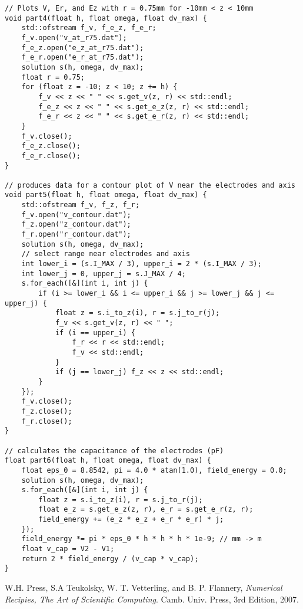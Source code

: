 \documentclass[12pt]{article}
\begin{document}
\begin{lstlisting}
// Plots V, Er, and Ez with r = 0.75mm for -10mm < z < 10mm
void part4(float h, float omega, float dv_max) {
    std::ofstream f_v, f_e_z, f_e_r;
    f_v.open("v_at_r75.dat");
    f_e_z.open("e_z_at_r75.dat");
    f_e_r.open("e_r_at_r75.dat");
    solution s(h, omega, dv_max);
    float r = 0.75;
    for (float z = -10; z < 10; z += h) {
        f_v << z << " " << s.get_v(z, r) << std::endl;
        f_e_z << z << " " << s.get_e_z(z, r) << std::endl;
        f_e_r << z << " " << s.get_e_r(z, r) << std::endl;
    }
    f_v.close();
    f_e_z.close();
    f_e_r.close();
}

// produces data for a contour plot of V near the electrodes and axis
void part5(float h, float omega, float dv_max) {
    std::ofstream f_v, f_z, f_r;
    f_v.open("v_contour.dat");
    f_z.open("z_contour.dat");
    f_r.open("r_contour.dat");
    solution s(h, omega, dv_max);
    // select range near electrodes and axis
    int lower_i = (s.I_MAX / 3), upper_i = 2 * (s.I_MAX / 3);
    int lower_j = 0, upper_j = s.J_MAX / 4;
    s.for_each([&](int i, int j) {
        if (i >= lower_i && i <= upper_i && j >= lower_j && j <= upper_j) {
            float z = s.i_to_z(i), r = s.j_to_r(j);
            f_v << s.get_v(z, r) << " ";
            if (i == upper_i) {
                f_r << r << std::endl;
                f_v << std::endl;
            }
            if (j == lower_j) f_z << z << std::endl;
        }
    });
    f_v.close();
    f_z.close();
    f_r.close();
}

// calculates the capacitance of the electrodes (pF)
float part6(float h, float omega, float dv_max) {
    float eps_0 = 8.8542, pi = 4.0 * atan(1.0), field_energy = 0.0;
    solution s(h, omega, dv_max);
    s.for_each([&](int i, int j) {
        float z = s.i_to_z(i), r = s.j_to_r(j);
        float e_z = s.get_e_z(z, r), e_r = s.get_e_r(z, r);
        field_energy += (e_z * e_z + e_r * e_r) * j;
    });
    field_energy *= pi * eps_0 * h * h * h * 1e-9; // mm -> m
    float v_cap = V2 - V1;
    return 2 * field_energy / (v_cap * v_cap);
}
\end{lstlisting}

\begin{thebibliography}{9}

  W.H. Press, S.A Teukolsky, W. T. Vetterling, and B. P. Flannery,
  \emph{Numerical Recipies, The Art of Scientific Computing}.
  Camb. Univ. Press,
  3rd Edition,
  2007.

\end{thebibliography}
\end{document}
